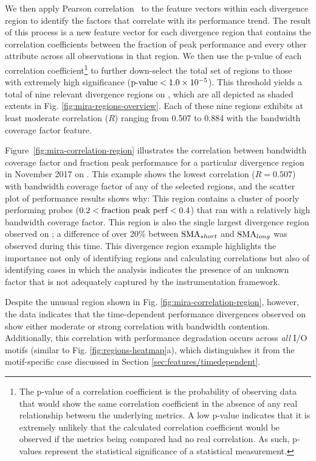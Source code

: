 We then apply Pearson correlation~\cite{Falk97manyfaces} to the feature vectors within each divergence region to identify the factors that correlate with its
performance trend.
The result of this process is a new feature vector for each divergence region that contains the correlation coefficients between the fraction of peak performance and every other attribute across all observations in that region.
We then use the p-value of each correlation coefficient\footnote{
The p-value of a correlation coefficient is the probability of observing data that would show the same correlation coefficient in the absence of any real relationship between the underlying metrics.
A low p-value indicates that it is extremely unlikely that the calculated correlation coefficient would be observed if the metrics being compared had no real correlation.
As such, p-values represent the statistical significance of a statistical measurement.}
to further down-select the total set of regions to those with extremely high significance
($\textup{p-value} < {1.0 \times 10^{-5}}$).
This threshold yields a total of nine relevant divergence regions on \mira \mirafsone, which are all depicted as shaded extents in Fig. \ref{fig:mira-regions-overview}.
Each of these nine regions exhibits at least moderate correlation ($R$) ranging from 0.507 to 0.884 with the bandwidth coverage factor feature.

Figure~\ref{fig:mira-correlation-region} illustrates the correlation between bandwidth coverage factor and fraction peak performance for a particular divergence region in November 2017 on \mira \mirafsone.
This example shows the lowest correlation ($R = 0.507$) with bandwidth coverage factor of any of the selected regions, and the scatter plot of performance results shows why:
This region contains a cluster of poorly performing probes (${0.2 < \textup{fraction peak perf} < 0.4}$) that ran with a relatively high bandwidth coverage factor.
This region is also the single largest divergence region observed on \mira; a difference of over 20\% between $\textup{SMA}_{short}$ and $\textup{SMA}_{long}$ was observed during this time.
This divergence region example highlights the importance not only of identifying regions and calculating correlations but also of identifying cases in which the analysis indicates the presence of an unknown factor that is not adequately captured by the instrumentation framework.

Despite the unusual region shown in Fig. \ref{fig:mira-correlation-region},
however, the data indicates that the time-dependent performance divergences observed on \mira show either moderate or strong correlation with bandwidth contention.
Additionally, this correlation with performance degradation occurs across
\emph{all} I/O motifs (similar to Fig. \ref{fig:regions-heatmap}a), which
distinguishes it from the motif-specific case discussed in Section
\ref{sec:features/timedependent}.  

